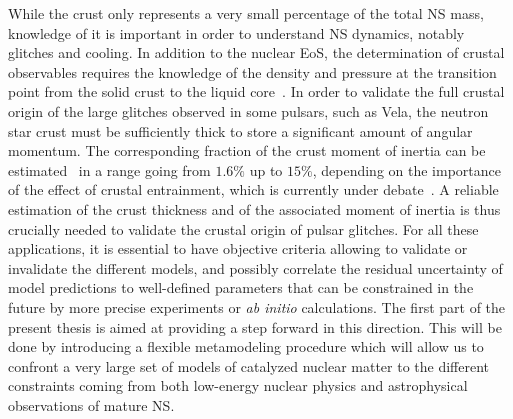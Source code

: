 While the crust only represents a very small percentage of the total NS mass, 
knowledge of it is important in order to understand NS dynamics, notably 
glitches and cooling. In addition to the nuclear EoS, the determination of
crustal observables requires the knowledge of the density and pressure at the
transition point from the solid crust to the liquid 
core~\cite{Piekarewicz2014}.
In order to validate the full crustal origin of the large glitches observed in 
some pulsars, such as Vela, the neutron star crust must be sufficiently thick 
to store a significant amount of angular momentum. The corresponding fraction 
of the crust moment of inertia can be 
estimated~\cite{Link1999,Andersson2012,Delsate2016} in a range going from 
$1.6\%$ up to $15\%$, depending on the importance of the effect of crustal 
entrainment, which is currently under debate~\cite{Martin2016,Watanabe2017}. A 
reliable estimation of the crust thickness and of the associated moment of 
inertia is thus crucially needed to validate the crustal origin of 
pulsar glitches.
%
For all these applications, it is essential to have objective criteria allowing 
to validate or invalidate the different models, and possibly correlate the 
residual uncertainty of model predictions to well-defined parameters that can 
be constrained in the future by more precise experiments or \textit{ab initio} 
calculations. The first part of the present thesis is aimed at providing a step 
forward in this direction. This will be done by introducing a flexible 
metamodeling procedure which will allow us to confront a very large set of 
models of catalyzed nuclear matter to the different constraints coming from 
both low-energy nuclear physics and astrophysical observations of mature 
NS. 

